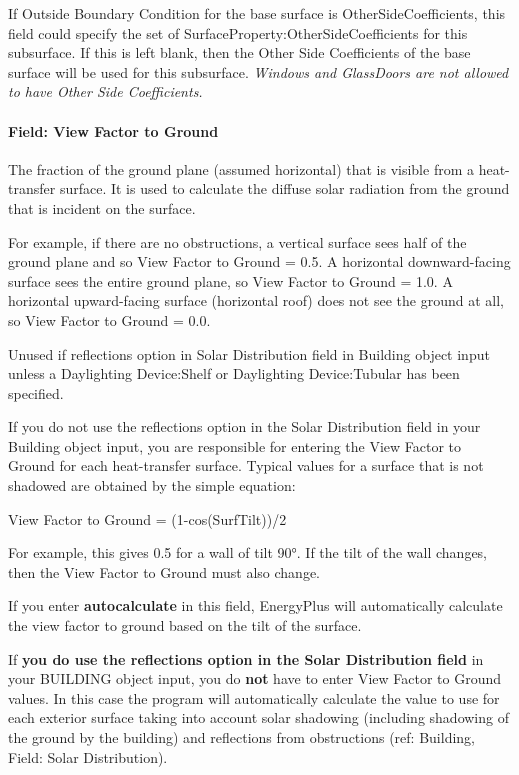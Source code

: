 If Outside Boundary Condition for the base surface is OtherSideCoefficients, this field could specify the set of SurfaceProperty:OtherSideCoefficients for this subsurface. If this is left blank, then the Other Side Coefficients of the base surface will be used for this subsurface. \emph{Windows and GlassDoors are not allowed to have Other Side Coefficients.}

\paragraph{Field: View Factor to Ground}\label{field-view-factor-to-ground-4}

The fraction of the ground plane (assumed horizontal) that is visible from a heat-transfer surface. It is used to calculate the diffuse solar radiation from the ground that is incident on the surface.

For example, if there are no obstructions, a vertical surface sees half of the ground plane and so View Factor to Ground = 0.5. A horizontal downward-facing surface sees the entire ground plane, so View Factor to Ground = 1.0. A horizontal upward-facing surface (horizontal roof) does not see the ground at all, so View Factor to Ground = 0.0.

Unused if reflections option in Solar Distribution field in Building object input unless a Daylighting Device:Shelf or Daylighting Device:Tubular has been specified.

If you do not use the reflections option in the Solar Distribution field in your Building object input, you are responsible for entering the View Factor to Ground for each heat-transfer surface. Typical values for a surface that is not shadowed are obtained by the simple equation:

View Factor to Ground = (1-cos(SurfTilt))/2

For example, this gives 0.5 for a wall of tilt 90°. If the tilt of the wall changes, then the View Factor to Ground must also change.

If you enter \textbf{autocalculate} in this field, EnergyPlus will automatically calculate the view factor to ground based on the tilt of the surface.

If \textbf{you do use the reflections option in the Solar Distribution field} in your BUILDING object input, you do \textbf{not} have to enter View Factor to Ground values. In this case the program will automatically calculate the value to use for each exterior surface taking into account solar shadowing (including shadowing of the ground by the building) and reflections from obstructions (ref: Building, Field: Solar Distribution).

